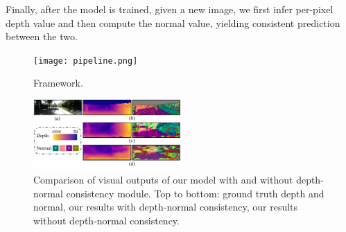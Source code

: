Finally, after the model is trained, given a new image,  we first infer per-pixel depth value and then compute the normal value, yielding consistent prediction between the two.


\begin{figure}
\centering
\texttt{[image: pipeline.png]}
\caption{Framework.}
\label{fig:pipeline}
\end{figure}



\begin{figure}
\centering
\includegraphics[width=0.5\textwidth]{figures/visual_comparison.pdf}
\caption{Comparison of visual outputs of our model with and without depth-normal consistency module. Top to bottom: ground truth depth and normal, our results with depth-normal consistency, our results without depth-normal consistency.}
\label{fig:visual_comparison}
\end{figure}

